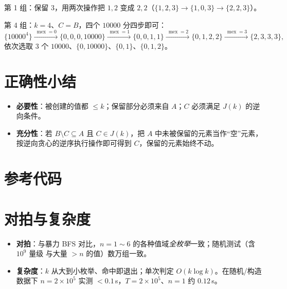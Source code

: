 \documentclass[11pt,a4paper]{article}
\begin{document}
第 1 组：保留 $3$，用两次操作把 $1,2$ 变成 $2,2$（$\{1,2,3\}\to\{1,0,3\}\to\{2,2,3\}$）。

第 4 组：$k=4$、$C=B$，四个 $10000$ 分四步即可：
\[
\{10000^{4}\}\xrightarrow{\ \operatorname{mex}=0\ }\{0,0,0,10000\}
\xrightarrow{\ \operatorname{mex}=1\ }\{0,0,1,1\}
\xrightarrow{\ \operatorname{mex}=2\ }\{0,1,2,2\}
\xrightarrow{\ \operatorname{mex}=3\ }\{2,3,3,3\},
\]
依次选取 $3$ 个 $10000$、$\{0,10000\}$、$\{0,1\}$、$\{0,1,2\}$。

\section{正确性小结}

\begin{itemize}
  \item \textbf{必要性}：被创建的值都 $\le k$；保留部分必须来自 $A$；$C$ 必须满足 $J(k)$ 的逆向条件。
  \item \textbf{充分性}：若 $B\setminus C\subseteq A$ 且 $C\in J(k)$，把 $A$ 中未被保留的元素当作“空”元素，
        按逆向贪心的逆序执行操作即可得到 $C$，保留的元素始终不动。
\end{itemize}

\section{参考代码}



\section{对拍与复杂度}

\begin{itemize}
  \item \textbf{对拍}：与暴力 BFS 对比，$n=1\sim6$ 的各种值域\emph{全枚举}一致；随机测试（含 $10^9$ 量级
        与大量 $>n$ 的值）数万组一致。
  \item \textbf{复杂度}：$k$ 从大到小枚举、命中即退出；单次判定 $O(k\log k)$。在随机/构造数据下
        $n=2\times10^5$ 实测 $<0.1$\,s，$T=2\times10^5$、$n=1$ 约 $0.12$\,s。
\end{itemize}
\end{document}
